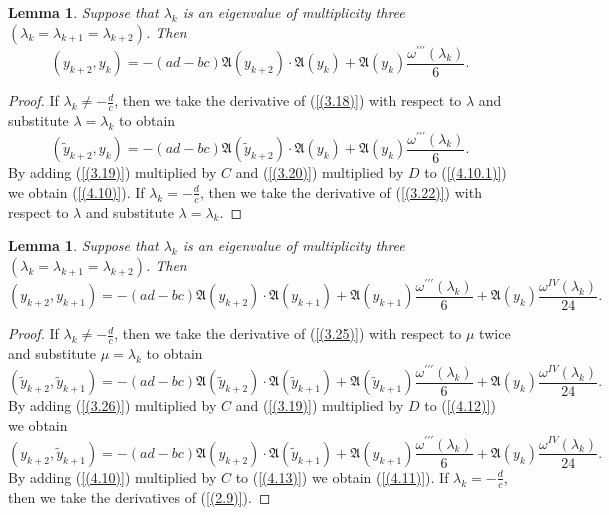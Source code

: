 \documentclass[10pt,a4paper]{amsart}
\newtheorem{lem}[thm]{Lemma}
\numberwithin{equation}{section}
\begin{document}
\begin{lem} Suppose that  $\lambda _{k}$ is an eigenvalue of multiplicity three \((\lambda_{k}=\lambda_{k+1} =\lambda_{k+2})\). Then
\begin{equation}
 (y_{k+2},y_{k})=- (ad - bc)\mathfrak{A}(y_{k+2})\cdot\mathfrak{A}(y_{k})+\mathfrak{A}(y_k)\frac{\omega^{\prime\prime\prime}(\lambda_k)}{6}. \label{(4.10)}
\end{equation}
\end{lem}
\begin{proof}
If $\lambda _{k}\ne -\frac{d}{c}$, then
we take the derivative of (\ref{(3.18)}) with respect to $\lambda$ and substitute $\lambda=\lambda_k$ to obtain
\begin{equation}
 (\tilde{y}_{k+2},y_{k})=- (ad - bc)\mathfrak{A}(\tilde{y}_{k+2})\cdot\mathfrak{A}(y_{k})+\mathfrak{A}(y_k)\frac{\omega^{\prime\prime\prime}(\lambda_k)}{6}. \label{(4.10.1)}
\end{equation}
By adding (\ref{(3.19)}) multiplied by $C$ and (\ref{(3.20)}) multiplied by $D$ to (\ref{(4.10.1)}) we obtain (\ref{(4.10)}).
If $\lambda _{k}=-\frac{d}{c}$, then we take the derivative of (\ref{(3.22)}) with respect to $\lambda$ and substitute $\lambda=\lambda_k$.
\end{proof}

\begin{lem} Suppose that  $\lambda _{k}$ is an eigenvalue of multiplicity three \((\lambda_{k}=\lambda_{k+1} =\lambda_{k+2})\). Then
\begin{equation}
 (y_{k+2},y_{k+1})=- (ad - bc)\mathfrak{A}(y_{k+2})\cdot\mathfrak{A}(y_{k+1})+\mathfrak{A}(\hat{y}_{k+1})\frac{\omega^{\prime\prime\prime}(\lambda_k)}{6}+ \mathfrak{A}({y}_{k})\frac{\omega^{IV}(\lambda_k)}{24}.\label{(4.11)}
\end{equation}
\end{lem}

\begin{proof}
If $\lambda _{k}\ne -\frac{d}{c}$, then
we take the derivative of (\ref{(3.25)}) with respect to $\mu$ twice and substitute $\mu=\lambda_k$ to obtain 
\begin{equation}
 (\tilde{y}_{k+2},\tilde{y}_{k+1})=- (ad - bc)\mathfrak{A}(\tilde{y}_{k+2})\cdot\mathfrak{A}(\tilde{y}_{k+1})+\mathfrak{A}(\tilde{y}_{k+1})\frac{\omega^{\prime\prime\prime}(\lambda_k)}{6}+ \mathfrak{A}({y}_{k})\frac{\omega^{IV}(\lambda_k)}{24}.\label{(4.12)}
\end{equation}
By adding (\ref{(3.26)}) multiplied by $C$ and (\ref{(3.19)}) multiplied by $D$ to (\ref{(4.12)}) we obtain 
\begin{equation}
 (y_{k+2},\tilde{y}_{k+1})=- (ad - bc)\mathfrak{A}(y_{k+2})\cdot\mathfrak{A}(\tilde{y}_{k+1})+\mathfrak{A}({y}_{k+1})\frac{\omega^{\prime\prime\prime}(\lambda_k)}{6}+ \mathfrak{A}({y}_{k})\frac{\omega^{IV}(\lambda_k)}{24}.\label{(4.13)}
\end{equation}
By adding (\ref{(4.10)}) multiplied by $C$ to (\ref{(4.13)}) we obtain (\ref{(4.11)}). If $\lambda _{k}=-\frac{d}{c}$, then we take the derivatives of (\ref{(2.9)}).
\end{proof}
\end{document}
